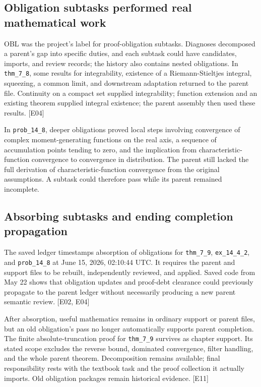 \subsection[Obligation subtasks performed real mathematical work]{\texorpdfstring{\protect\hypertarget{b1}{}Obligation subtasks performed real mathematical work}{Obligation subtasks performed real mathematical work}}
OBL was the project's label for proof-obligation subtasks. Diagnoses decomposed a parent's gap into specific duties, and each subtask could have candidates, imports, and review records; the history also contains nested obligations. In \nolinkurl{thm_7_8}, some results for integrability, existence of a Riemann-Stieltjes integral, squeezing, a common limit, and downstream adaptation returned to the parent file. Continuity on a compact set supplied integrability; function extension and an existing theorem supplied integral existence; the parent assembly then used these results. [E04]

In \nolinkurl{prob_14_8}, deeper obligations proved local steps involving convergence of complex moment-generating functions on the real axis, a sequence of accumulation points tending to zero, and the implication from characteristic-function convergence to convergence in distribution. The parent still lacked the full derivation of characteristic-function convergence from the original assumptions. A subtask could therefore pass while its parent remained incomplete.

\subsection[Absorbing subtasks and ending completion propagation]{\texorpdfstring{\protect\hypertarget{b2}{}Absorbing subtasks and ending completion propagation}{Absorbing subtasks and ending completion propagation}}
The saved ledger timestamps absorption of obligations for \nolinkurl{thm_7_9}, \nolinkurl{ex_14_4_2}, and \nolinkurl{prob_14_8} at June 15, 2026, 02:10:44 UTC. It requires the parent and support files to be rebuilt, independently reviewed, and applied. Saved code from May 22 shows that obligation updates and proof-debt clearance could previously propagate to the parent ledger without necessarily producing a new parent semantic review. [E02, E04]

After absorption, useful mathematics remains in ordinary support or parent files, but an old obligation's pass no longer automatically supports parent completion. The finite absolute-truncation proof for \nolinkurl{thm_7_9} survives as chapter support. Its stated scope excludes the reverse bound, dominated convergence, filter handling, and the whole parent theorem. Decomposition remains available; final responsibility rests with the textbook task and the proof collection it actually imports. Old obligation packages remain historical evidence. [E11]

